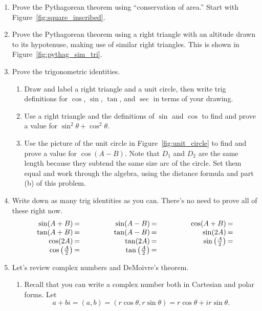 \documentclass[../gatm.tex]{subfiles}
\begin{document}
\begin{enumerate}
\item Prove the Pythagorean theorem using ``conservation of area.'' Start with Figure~\ref{fig:square_inscribed}.
\item Prove the Pythagorean theorem using a right triangle with an altitude drawn to its hypotenuse, making use of similar right triangles. This is shown in Figure~\ref{fig:pythag_sim_tri}.
\item Prove the trigonometric identities.
\begin{enumerate}
\item Draw and label a right triangle and a unit circle, then write trig definitions for $\cos$, $\sin$, $\tan$, and $\sec$ in terms of your drawing.
\item Use a right triangle and the definitions of $\sin$ and $\cos$ to find and prove a value for $\sin^2 \theta + \cos^2 \theta$.
\item Use the picture of the unit circle in Figure~\ref{fig:unit_circle} to find and prove a value for $\cos(A-B)$. Note that $D_1$ and $D_2$ are the same length because they subtend the same size arc of the circle. Set them equal and work through the algebra, using the distance formula and part (b) of this problem.
\end{enumerate}
\item Write down as many trig identities as you can. There's no need to prove all of these right now.
\renewcommand{\arraystretch}{1.1}
$$\arraycolsep=1pt\begin{array}{rlrlrl}
\sin(A+B)&=\qquad\qquad\phantom{.}&\sin(A-B) &=\qquad\qquad\phantom{.}&\cos(A+B) &= \\
\tan(A+B)&= &\tan(A-B) &= &\sin(2A) &= \\
\cos(2A)&= &\tan(2A) &= &\sin\left(\frac{A}{2}\right) &= \\
\cos\left(\frac{A}{2}\right)&= &\tan\left(\frac{A}{2}\right) &= & & \\
\end{array}$$

\item Let's review complex numbers and DeMoivre's theorem.
\begin{enumerate}
\item Recall that you can write a complex number both in Cartesian and polar forms. Let
\[a+bi=(a,b)=(r\cos\theta,r\sin\theta)=r\cos\theta+ir\sin\theta.\]


\end{enumerate}
\end{enumerate}
\end{document}
